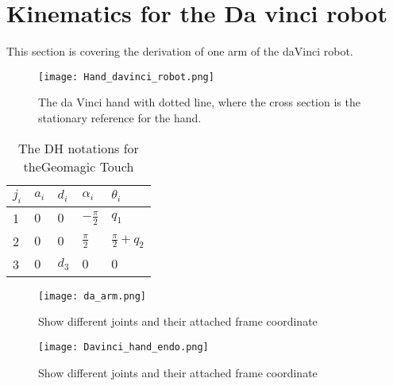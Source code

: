 \section{Kinematics for the Da vinci robot}
This section is covering the derivation of one arm of the daVinci robot. 



\begin{figure}[H]
		\centering
		\texttt{[image: Hand\_davinci\_robot.png]}
		\caption{The da Vinci hand with dotted line, where the cross section is the stationary reference for the hand.}
		\label{fig:da_ha_en}
\end{figure}





\begin{table}[H]
\centering
\begin{tabular}{|l|l|l|l|l|}
\hline
 $j_i$ 	  & $a_i$    & $d_i$ & $\alpha_i$ 		 & $\theta_i$ 			   	 \\ \hline
 1  	  &  $0$     & $0$ 	 & $-\frac{\pi}{2}$	 		 & $q_1$ 			    	 \\ \hline
 2  	  &  $0$   	 & $0$ 	 & $ \frac{\pi}{2}$ 	 & $\frac{\pi}{2}+q_2$ 		 \\ \hline
 3  	  &  $0$	 & $d_3$ & $0$ 		 		 & $0$ 					 \\ \hline
\end{tabular}
\caption{The DH notations for the\newline Geomagic Touch}
\label{tab:kin_geo}
\end{table}



\begin{sidewaysfigure}
		\centering
		\texttt{[image: da\_arm.png]}
		\caption{Show different joints and their attached frame coordinate}
		\label{fig:da_ha_en}
\end{sidewaysfigure}



\begin{sidewaysfigure}
		\centering
		\texttt{[image: Davinci\_hand\_endo.png]}
		\caption{Show different joints and their attached frame coordinate}
		\label{fig:da_ha_en}
\end{sidewaysfigure}

